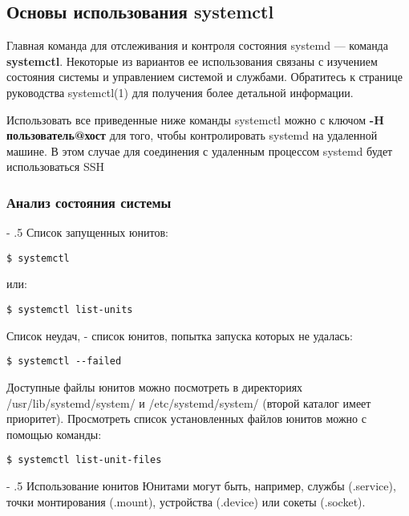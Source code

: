 \documentclass[a4paper,10pt,twoside]{article}
\makeatletter
\renewcommand\paragraph{%
   \@startsection{paragraph}{4}{0mm}%
      {-\baselineskip}%
      {.5\baselineskip}%
      {\normalfont\normalsize\bfseries}}
\makeatother
\begin{document}
\subsection{Основы использования systemctl}
Главная команда для отслеживания и контроля состояния systemd — команда \textbf{systemctl}. Некоторые из вариантов ее использования связаны с изучением состояния системы и управлением системой и службами. Обратитесь к странице руководства systemctl(1) для получения более детальной информации.

Использовать все приведенные ниже команды systemctl можно с ключом \textbf{-H пользователь@хост} для того, чтобы контролировать systemd на удаленной машине. В этом случае для соединения с удаленным процессом systemd будет использоваться SSH


\subsubsection{Анализ состояния системы}
\paragraph{Список запущенных юнитов:}

\begin{verbatim}
$ systemctl
\end{verbatim} 

или:

\begin{verbatim}
$ systemctl list-units
\end{verbatim} 

Список неудач, - список юнитов, попытка запуска которых не удалась:

\begin{verbatim}
$ systemctl --failed
\end{verbatim} 

Доступные файлы юнитов можно посмотреть в директориях /usr/lib/systemd/system/ и /etc/systemd/system/ (второй каталог имеет приоритет). Просмотреть список установленных файлов юнитов можно с помощью команды:

\begin{verbatim}
$ systemctl list-unit-files
\end{verbatim} 

\paragraph{Использование юнитов}
Юнитами могут быть, например, службы (.service), точки монтирования (.mount), устройства (.device) или сокеты (.socket).
\end{document}
